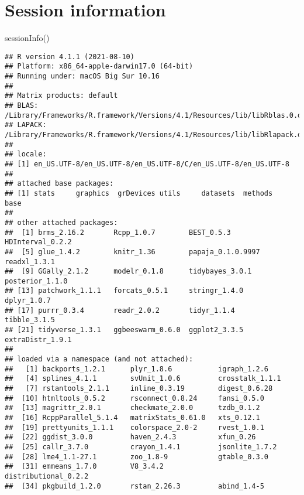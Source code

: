 \documentclass[
  11pt,
  english,
  ,doc,floatsintext]{apa6}
\newenvironment{Shaded}{}{}
\newcommand{\FunctionTok}[1]{\textcolor[rgb]{0.02,0.16,0.49}{#1}}
\newcommand{\NormalTok}[1]{#1}
\begin{document}
\newpage

\hypertarget{session-information}{%
\section{Session information}\label{session-information}}

\begin{Shaded}
\begin{Highlighting}[]
\FunctionTok{sessionInfo}\NormalTok{()}
\end{Highlighting}
\end{Shaded}

\begin{verbatim}
## R version 4.1.1 (2021-08-10)
## Platform: x86_64-apple-darwin17.0 (64-bit)
## Running under: macOS Big Sur 10.16
## 
## Matrix products: default
## BLAS:   /Library/Frameworks/R.framework/Versions/4.1/Resources/lib/libRblas.0.dylib
## LAPACK: /Library/Frameworks/R.framework/Versions/4.1/Resources/lib/libRlapack.dylib
## 
## locale:
## [1] en_US.UTF-8/en_US.UTF-8/en_US.UTF-8/C/en_US.UTF-8/en_US.UTF-8
## 
## attached base packages:
## [1] stats     graphics  grDevices utils     datasets  methods   base     
## 
## other attached packages:
##  [1] brms_2.16.2       Rcpp_1.0.7        BEST_0.5.3        HDInterval_0.2.2 
##  [5] glue_1.4.2        knitr_1.36        papaja_0.1.0.9997 readxl_1.3.1     
##  [9] GGally_2.1.2      modelr_0.1.8      tidybayes_3.0.1   posterior_1.1.0  
## [13] patchwork_1.1.1   forcats_0.5.1     stringr_1.4.0     dplyr_1.0.7      
## [17] purrr_0.3.4       readr_2.0.2       tidyr_1.1.4       tibble_3.1.5     
## [21] tidyverse_1.3.1   ggbeeswarm_0.6.0  ggplot2_3.3.5     extraDistr_1.9.1 
## 
## loaded via a namespace (and not attached):
##   [1] backports_1.2.1      plyr_1.8.6           igraph_1.2.6        
##   [4] splines_4.1.1        svUnit_1.0.6         crosstalk_1.1.1     
##   [7] rstantools_2.1.1     inline_0.3.19        digest_0.6.28       
##  [10] htmltools_0.5.2      rsconnect_0.8.24     fansi_0.5.0         
##  [13] magrittr_2.0.1       checkmate_2.0.0      tzdb_0.1.2          
##  [16] RcppParallel_5.1.4   matrixStats_0.61.0   xts_0.12.1          
##  [19] prettyunits_1.1.1    colorspace_2.0-2     rvest_1.0.1         
##  [22] ggdist_3.0.0         haven_2.4.3          xfun_0.26           
##  [25] callr_3.7.0          crayon_1.4.1         jsonlite_1.7.2      
##  [28] lme4_1.1-27.1        zoo_1.8-9            gtable_0.3.0        
##  [31] emmeans_1.7.0        V8_3.4.2             distributional_0.2.2
##  [34] pkgbuild_1.2.0       rstan_2.26.3         abind_1.4-5         

\end{verbatim}
\end{document}

